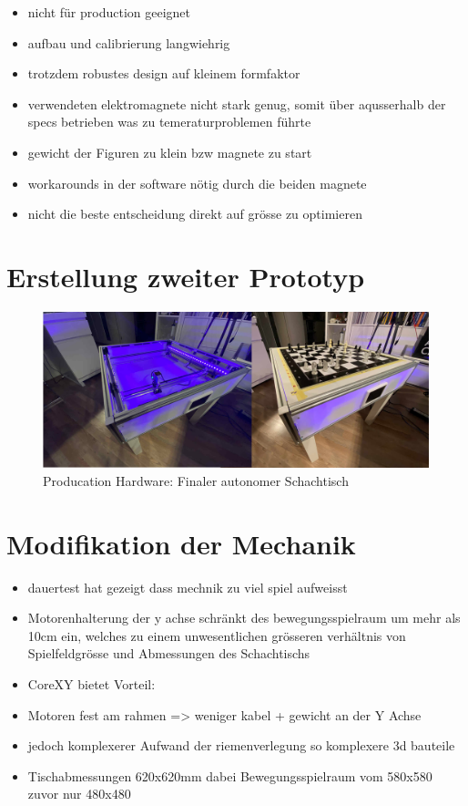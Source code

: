 \begin{itemize}
\tightlist
\item
  nicht für production geeignet
\item
  aufbau und calibrierung langwiehrig
\item
  trotzdem robustes design auf kleinem formfaktor
\item
  verwendeten elektromagnete nicht stark genug, somit über aqusserhalb
  der specs betrieben was zu temeraturproblemen führte
\item
  gewicht der Figuren zu klein bzw magnete zu start
\item
  workarounds in der software nötig durch die beiden magnete
\item
  nicht die beste entscheidung direkt auf grösse zu optimieren
\end{itemize}

\hypertarget{erstellung-zweiter-prototyp}{%
\section{Erstellung zweiter
Prototyp}\label{erstellung-zweiter-prototyp}}

\begin{figure}
\centering
\includegraphics{images/table_images/prod.png}
\caption{Producation Hardware: Finaler autonomer Schachtisch}
\end{figure}

\hypertarget{modifikation-der-mechanik}{%
\section{Modifikation der Mechanik}\label{modifikation-der-mechanik}}

\begin{itemize}
\tightlist
\item
  dauertest hat gezeigt dass mechnik zu viel spiel aufweisst
\item
  Motorenhalterung der y achse schränkt des bewegungsspielraum um mehr
  als 10cm ein, welches zu einem unwesentlichen grösseren verhältnis von
  Spielfeldgrösse und Abmessungen des Schachtischs
\item
  CoreXY bietet Vorteil:
\item
  Motoren fest am rahmen =\textgreater{} weniger kabel + gewicht an der
  Y Achse
\item
  jedoch komplexerer Aufwand der riemenverlegung so komplexere 3d
  bauteile
\item
  Tischabmessungen 620x620mm dabei Bewegungsspielraum vom 580x580 zuvor
  nur 480x480
\end{itemize}

